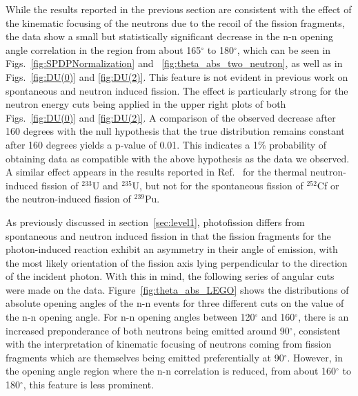 \label{sec:anomaly}
While the results reported in the previous section are consistent with the effect of the kinematic focusing of the neutrons due to the recoil of the fission fragments, the data show a small but statistically significant decrease in the n-n opening angle correlation in the region from about 165$^{\circ}$ to 180$^{\circ}$, which can be seen in Figs.~\ref{fig:SPDPNormalization} and ~\ref{fig:theta_abs_two_neutron}, as well as in Figs.~\ref{fig:DU(0)} and \ref{fig:DU(2)}.
This feature is not evident in previous work on spontaneous and neutron induced fission.
The effect is particularly strong for the neutron energy cuts being applied in the upper right plots of both Figs.~\ref{fig:DU(0)} and \ref{fig:DU(2)}.
A comparison of the observed decrease after 160 degrees with the null hypothesis that the true distribution remains constant after 160 degrees yields a p-value of 0.01.
This indicates a 1\% probability of obtaining data as compatible with the above hypothesis as the data we observed.
A similar effect appears in the results reported in Ref.~\cite{Sokolov2010} for the thermal neutron-induced fission of $^{233}$U and $^{235}$U, but not for the spontaneous fission of $^{252}$Cf or the neutron-induced fission of $^{239}$Pu.

As previously discussed in section~\ref{sec:level1}, photofission differs from spontaneous and neutron induced fission in that the fission fragments for the photon-induced reaction exhibit an asymmetry in their angle of emission, with the most likely orientation of the fission axis lying perpendicular to the direction of the incident photon.
With this in mind, the following series of angular cuts were made on the data.
Figure~\ref{fig:theta_abs_LEGO} shows the distributions of absolute opening angles of the n-n events for three different cuts on the value of the n-n opening angle.
For n-n opening angles between 120$^{\circ}$ and 160$^{\circ}$, there is an increased preponderance of both neutrons being emitted around 90$^{\circ}$, consistent with the interpretation of kinematic focusing of neutrons coming from fission fragments which are themselves being emitted preferentially at 90$^{\circ}$.
However, in the opening angle region where the n-n correlation is reduced, from about 160$^{\circ}$ to 180$^{\circ}$, this feature is less prominent.

